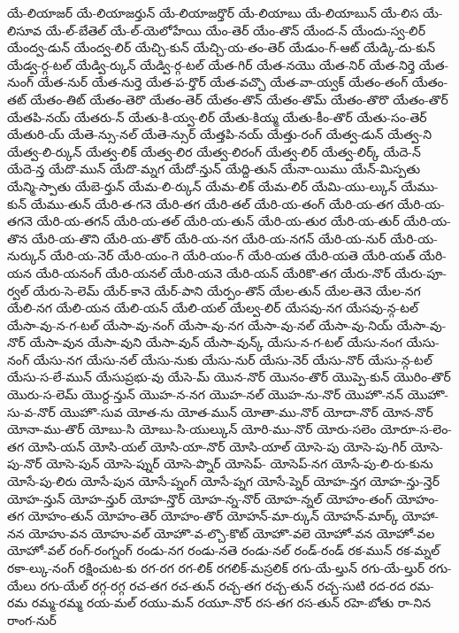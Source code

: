 {యే-లియాజర్
యే-లియాజర్తున్
యే-లియాజర్తొర్
యే-లియాబు
యే-లియాబున్
యే-లిస
యే-లిసూవ
యే-ల్-బేతెల్
యే-ల్-యెలోహేయి
యేం-తెర్
యేం-తొన్
యేంద-న్
యేందు-స్వ-లిర్
యేంద్వ-డున్
యేంద్వ-లిర్
యేచ్చి-కున్
యేచ్చి-య-తం-తెర్
యేడుం-గ్-ఆట్
యేడ్కి-దు-కున్
యేడ్వ-ర్గ-టల్
యేడ్వి-ర్కున్
యేడ్వి-ర్గ-టల్
యేత-గిర్
యేత-నయొ
యేత-నిర్
యేత-నిర్తె
యేత-నుంగ్
యేత-నుర్
యేత-నుర్తె
యేత-ప-ర్తొర్
యేత-వచ్చొ
యేత-వా-య్వక్
యేతం-తంగ్
యేతం-తట్
యేతం-తిట్
యేతం-తెరొ
యేతం-తెర్
యేతం-తొన్
యేతం-తొమ్
యేతం-తొరొ
యేతం-తొర్
యేతపి-నయ్
యేతరు-న్
యేతు-కి-య్వ-లిర్
యేతు-కియ్మ
యేతు-కీం-తొర్
యేతు-సం-తెర్
యేతురి-య్
యేతె-న్సు-నల్
యేతె-న్సుర్
యేత్తపి-నయ్
యేత్తు-రంగ్
యేత్వ-డున్
యేత్వ-ని
యేత్వ-లి-ర్కున్
యేత్వ-లిక్
యేత్వ-లిర
యేత్వ-లిరంగ్
యేత్వ-లిర్
యేత్వ-లిర్క్
యేదె-న్
యేదె-న్త
యేదొ-మున్
యేదొ-మ్నగ
యేదో-న్తున్
యేద్ది-తున్
యేనా-యిము
యేన్-మిస్పతు
యేన్మి-స్పాతు
యేబె-ర్తున్
యేమ-లి-ర్కున్
యేమ-లిక్
యేమ-లిర్
యేమి-యు-ల్కున్
యేము-కున్
యేము-తున్
యేరి-త-గనె
యేరి-తగ
యేరి-తల్
యేరి-య-తంగ్
యేరి-య-తగ
యేరి-య-తగనె
యేరి-య-తగన్
యేరి-య-తల్
యేరి-య-తున్
యేరి-య-తుర
యేరి-య-తుర్
యేరి-య-తొన
యేరి-య-తొని
యేరి-య-తొర్
యేరి-య-నగ
యేరి-య-నగన్
యేరి-య-నుర్
యేరి-య-నుర్కున్
యేరి-య-నెర్
యేరి-యం-గె
యేరి-యం-గ్
యేరి-యత
యేరి-యతె
యేరి-యత్
యేరి-యన
యేరి-యనంగ్
యేరి-యనల్
యేరి-యనె
యేరి-యన్
యేరికొ-తగ
యేరు-నొర్
యేరు-పూ-ర్వల్
యేరు-సె-లెమ్
యేర్-కానె
యేర్-పాని
యేర్పం-తొన్
యేల-తున్
యేల-తెనె
యేల-నగ
యేలి-నగ
యేలి-యన
యేలి-యన్
యేలి-యల్
యేల్వ-లిర్
యేసవు-నగ
యేసవు-న్గ-టల్
యేసా-వు-న-గ-టల్
యేసా-వు-నంగ్
యేసా-వు-నగ
యేసా-వు-నల్
యేసా-వు-నియ్
యేసా-వు-నొర్
యేసా-వున
యేసా-వుని
యేసా-వున్
యేసా-వున్క్
యేసు-న-గ-టల్
యేసు-నంగ
యేసు-నంగ్
యేసు-నగ
యేసు-నల్
యేసు-నుకు
యేసు-నుర్
యేసు-నెర్
యేసు-నొర్
యేసు-న్గ-టల్
యేసు-స-లే-మున్
యేసుప్రభు-వు
యేసె-మ్
యొన-నొర్
యొనం-తొర్
యొప్పె-కున్
యొరిం-తొర్
యొరు-స-లెమ్
యొర్ద-న్తున్
యొహ-న-నగ
యొహ-నల్
యొహ-ను-నొర్
యొహొ-నన్
యొహొ-సు-వ-నొర్
యొహొ-సువ
యోత-ను
యోత-మున్
యోతా-ము-నొర్
యోదా-నొర్
యోన-నొర్
యోనా-ము-తొర్
యోబు-సి
యోబు-సి-యుల్కున్
యోరి-ము-నొర్
యోరు-సలెం
యోరూ-స-లెం-తగ
యోసి-యన్
యోసి-యల్
యోసి-యా-నొర్
యోసి-యాల్
యోసె-పు
యోసె-పు-గిర్
యోసె-పు-నొర్
యోసె-పున్
యోసె-ప్నుర్
యోసె-ప్నొర్
యోసెప్-
యోసెప్-నగ
యోసే-పు-లి-రు-కును
యోసే-పు-లిరు
యోసే-పున
యోసే-ప్నంగ్
యోసే-ప్నగ
యోసే-ప్నెర్
యోహ-న్తగ
యోహ-న్తు-న్తెర్
యోహ-న్తున్
యోహ-న్తుర్
యోహ-న్తొర్
యోహ-న్న-నొర్
యోహ-న్నల్
యోహం-తంగ్
యోహం-తగ
యోహం-తున్
యోహం-తెర్
యోహం-తొర్
యోహన్-మా-ర్కున్
యోహన్-మార్క్
యోహా-నన
యోహు-వన
యోహు-వల్
యోహొ-వ-ల్చొ-కొట్
యోహొ-వలె
యోహో-వన
యోహో-వల
యోహో-వల్
రంగ్-రంగ్నంగ్
రండు-నగ
రండు-నతె
రండు-నల్
రండ్-రండ్
రక-మున్
రక-మ్నల్
రకా-ల్కు-నంగ్
రక్షించుట-కు
రగ-రగ
రగ-లిక్
రగలిక్-మస్రలిక్
రగు-యే-ల్తున్
రగు-యే-ల్తుర్
రగు-యేలు
రగు-యేల్
రగ్గ-రగ్గ
రచ-తగ
రచ-తున్
రచ్చ-తగ
రచ్చ-తున్
రచ్చ-సుటి
రద-రద
రమ-రమ
రమ్మ-రమ్మ
రయ-మల్
రయు-మన్
రయూ-నొర్
రస-తగ
రస-తున్
రహె-బోతు
రా-నిన
రాంగ-నుర్
}
